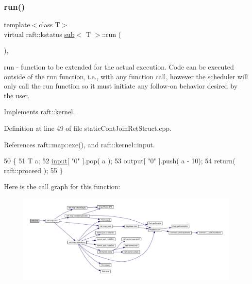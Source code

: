 \subsubsection{\texorpdfstring{run()}{run()}\hspace{0.1cm}{\footnotesize\ttfamily [11/12]}}
{\footnotesize\ttfamily template$<$class T$>$ \\
virtual raft\+::kstatus \hyperlink{classsub}{sub}$<$ T $>$\+::run (\begin{DoxyParamCaption}{ }\end{DoxyParamCaption})\hspace{0.3cm}{\ttfamily [inline]}, {\ttfamily [virtual]}}

run -\/ function to be extended for the actual execution. Code can be executed outside of the run function, i.\+e., with any function call, however the scheduler will only call the run function so it must initiate any follow-\/on behavior desired by the user. 

Implements \hyperlink{classraft_1_1kernel_a05094286d7577360fb1b91c91fc05901}{raft\+::kernel}.



Definition at line 49 of file static\+Cont\+Join\+Ret\+Struct.\+cpp.



References raft\+::map\+::exe(), and raft\+::kernel\+::input.


\begin{DoxyCode}
50     \{
51         T a;
52         \hyperlink{classraft_1_1kernel_a6edbe35a56409d402e719b3ac36d6554}{input}[ \textcolor{stringliteral}{"0"} ].pop( a );
53         output[ \textcolor{stringliteral}{"0"} ].push( a - 10);
54         \textcolor{keywordflow}{return}( raft::proceed );
55     \}
\end{DoxyCode}
Here is the call graph for this function\+:
\nopagebreak
\begin{figure}[H]
\begin{center}
\leavevmode
\includegraphics[width=350pt]{classsub_a0a0c7461433ee8b5f4b24305282bf69a_cgraph}
\end{center}
\end{figure}
\hypertarget{classsub_a0a0c7461433ee8b5f4b24305282bf69a}{}\label{classsub_a0a0c7461433ee8b5f4b24305282bf69a} 
